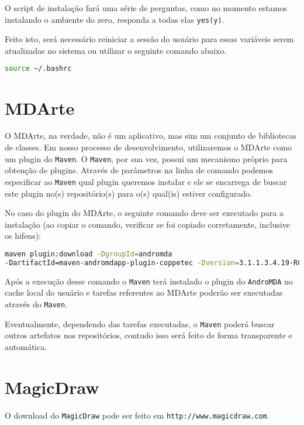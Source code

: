 O script de instalação fará uma série de perguntas, como no momento estamos
instalando o ambiente do zero, responda a todas elas \texttt{yes(y)}.

Feito isto, será necessário reiniciar a sessão do usuário para essas variáveis
serem atualizadas no sistema ou utilizar o seguinte comando abaixo.

\begin{lstlisting}[language=bash]
source ~/.bashrc
\end{lstlisting}

\section{MDArte}

O MDArte, na verdade, não é um aplicativo, mas sim um conjunto de bibliotecas de
classes. Em nosso processo de desenvolvimento, utilizaremos o MDArte como um
plugin do \texttt{Maven}. O \texttt{Maven}, por sua vez, possui um mecanismo
próprio para obtenção de plugins. Através de parâmetros na linha de comando
podemos especificar ao \texttt{Maven} qual plugin queremos instalar e ele se
encarrega de buscar este plugin no(s) repositório(s) para o(s) qual(is) estiver
configurado.

No caso do plugin do MDArte, o seguinte comando deve ser executado para a
instalação (ao copiar o comando, verificar se foi copiado corretamente,
inclusive os hifens):

\begin{lstlisting}[language=bash]
maven plugin:download -DgroupId=andromda
-DartifactId=maven-andromdapp-plugin-coppetec -Dversion=3.1.1.3.4.19-RC8
\end{lstlisting}
	
Após a execução desse comando o \texttt{Maven} terá instalado o plugin do
\texttt{AndroMDA} no cache local do usuário e tarefas referentes ao MDArte
poderão ser executadas através do \texttt{Maven}.

Eventualmente, dependendo das tarefas executadas, o \texttt{Maven} poderá buscar
outros artefatos nos repositórios, contudo isso será feito de forma transparente
e automática.

\section{MagicDraw}

O download do \texttt{MagicDraw} pode ser feito em
\texttt{http://www.magicdraw.com}.


